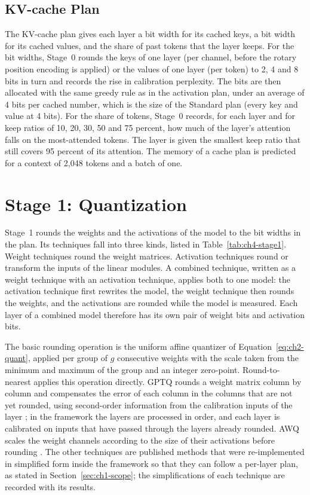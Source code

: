 \documentclass[
11pt, %
english, %
singlespacing, %
headsepline, %
]{MastersDoctoralThesis} %
\begin{document}
\subsection{KV-cache Plan}
\label{sec:ch4-kvplan}

The KV-cache plan gives each layer a bit width for its cached keys, a bit width for its cached values, and the share of past tokens that the layer keeps. For the bit widths, Stage~0 rounds the keys of one layer (per channel, before the rotary position encoding is applied) or the values of one layer (per token) to 2, 4 and 8 bits in turn and records the rise in calibration perplexity. The bits are then allocated with the same greedy rule as in the activation plan, under an average of 4 bits per cached number, which is the size of the Standard plan (every key and value at 4 bits). For the share of tokens, Stage~0 records, for each layer and for keep ratios of 10, 20, 30, 50 and 75 percent, how much of the layer's attention falls on the most-attended tokens. The layer is given the smallest keep ratio that still covers 95 percent of its attention. The memory of a cache plan is predicted for a context of 2{,}048 tokens and a batch of one.


\section{Stage 1: Quantization}
\label{sec:ch4-stage1}

Stage~1 rounds the weights and the activations of the model to the bit widths in the plan. Its techniques fall into three kinds, listed in Table~\ref{tab:ch4-stage1}. Weight techniques round the weight matrices. Activation techniques round or transform the inputs of the linear modules. A combined technique, written as a weight technique with an activation technique, applies both to one model: the activation technique first rewrites the model, the weight technique then rounds the weights, and the activations are rounded while the model is measured. Each layer of a combined model therefore has its own pair of weight bits and activation bits.

The basic rounding operation is the uniform affine quantizer of Equation~\ref{eq:ch2-quant}, applied per group of $g$ consecutive weights with the scale taken from the minimum and maximum of the group and an integer zero-point. Round-to-nearest applies this operation directly. GPTQ rounds a weight matrix column by column and compensates the error of each column in the columns that are not yet rounded, using second-order information from the calibration inputs of the layer \cite{frantar2023gptq}; in the framework the layers are processed in order, and each layer is calibrated on inputs that have passed through the layers already rounded. AWQ scales the weight channels according to the size of their activations before rounding \cite{lin2024awq}. The other techniques are published methods that were re-implemented in simplified form inside the framework so that they can follow a per-layer plan, as stated in Section~\ref{sec:ch1-scope}; the simplifications of each technique are recorded with its results.
\end{document}

